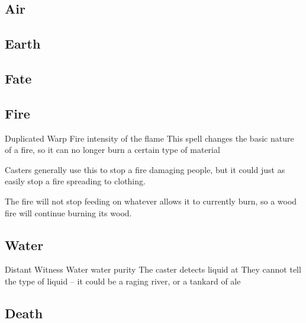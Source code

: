\begin{multicols}{2}

\subsection{Air}


\subsection{Earth}


\subsection{Fate}


\subsection{Fire}


  {Duplicated}%
  {Warp}%
  {Fire}%
  {intensity of the flame}%
  {This spell changes the basic nature of a fire, so it can no longer burn a certain type of material}%
  {Casters generally use this to stop a fire damaging people, but it could just as easily stop a fire spreading to clothing.

    The fire will not stop feeding on whatever allows it to currently burn, so a wood fire will continue burning its wood.}

\subsection{Water}


  {Distant}%
  {Witness}%
  {Water}%
  {water purity}%
  {The caster detects liquid at \spellRange}%
  {They cannot tell the type of liquid -- it could be a raging river, or a tankard of ale}

\subsection{Death}


\end{multicols}
